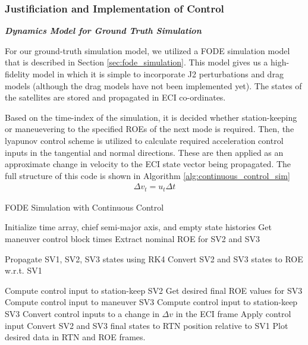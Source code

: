 \subsubsection{Justificiation and Implementation of Control}

\textbf{\textit{Dynamics Model for Ground Truth Simulation}}

For our ground-truth simulation model, we utilized a FODE simulation model that is described in Section \ref{sec:fode_simulation}. This model gives us a high-fidelity model in which it is simple to incorporate J2 perturbations and drag models (although the drag models have not been implemented yet). The states of the satellites are stored and propagated in ECI co-ordinates. 

Based on the time-index of the simulation, it is decided whether station-keeping or maneuevering to the specified ROEs of the next mode is required. Then, the lyapunov control scheme is utilized to calculate required acceleration control inputs in the tangential and normal directions. These are then applied as an approximate change in velocity to the ECI state vector being propagated. The full structure of this code is shown in Algorithm \ref{alg:continuous_control_sim}
\begin{align}
    \Delta v_t = u_t \Delta t
\end{align}

\begin{algorithm}[H]
\caption{FODE Simulation with Continuous Control}
\begin{algorithmic}[1]

\State Initialize time array, chief semi-major axis, and empty state histories
\State Get maneuver control block times
\State Extract nominal ROE for SV2 and SV3

    \State Propagate SV1, SV2, SV3 states using RK4
    \State Convert SV2 and SV3 states to ROE w.r.t. SV1

    \State Compute control input to station-keep SV2
        \State Get desired final ROE values for SV3
        \State Compute control input to maneuver SV3
    \Else
        \State Compute control input to station-keep SV3
    \EndIf
    \State Convert control inputs to a change in $\Delta v$ in the ECI frame
    \State Apply control input
\EndFor
\State Convert SV2 and SV3 final states to RTN position relative to SV1
\State Plot desired data in RTN and ROE frames.
\EndProcedure
\end{algorithmic}
\end{algorithm} \label{alg:continuous_control_sim}

